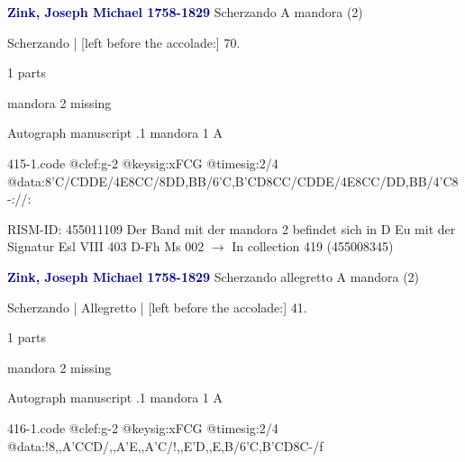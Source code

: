 \documentclass[twocolumn]{book}
\begin{document}
\newline \par \vspace{7pt} \textcolor{darkblue}{\textbf{Zink, Joseph Michael  1758-1829}}
\newline Scherzando  A  
\newline mandora (2)
\newline \begin{itshape}[f.36v, at left:] Scherzando | [left before the accolade:] 70.\end{itshape} 
\newline \textcolor{darkblue}{}  1 parts  
\newline \begin{small} mandora 2 missing\end{small} 
\newline Autograph manuscript
.1  mandora 1  A  
\begin{filecontents*}{415-1.code}
@clef:g-2
@keysig:xFCG
@timesig:2/4
@data:8'C/CDDE/4E{8CC}/8DD,BB/{6'C,B'CD}{8CC}/CDDE/4E{8CC}/DD,BB/4'C8-://:
\end{filecontents*}
\newline
%

\newline RISM-ID: 455011109
\newline Der Band mit der mandora 2 befindet sich in D Eu mit der Signatur Esl VIII 403
\newline D-Fh  Ms 002
\newline $\rightarrow$ In collection 419 (455008345)

\newline \par \vspace{7pt} \textcolor{darkblue}{\textbf{Zink, Joseph Michael  1758-1829}}
\newline Scherzando allegretto  A  
\newline mandora (2)
\newline \begin{itshape}[f.24r, at left:] Scherzando | Allegretto | [left before the accolade:] 41.\end{itshape} 
\newline \textcolor{darkblue}{}  1 parts  
\newline \begin{small} mandora 2 missing\end{small} 
\newline Autograph manuscript
.1  mandora 1  A  
\begin{filecontents*}{416-1.code}
@clef:g-2
@keysig:xFCG
@timesig:2/4
@data:!8,,A'CCD/,,A'E,,A'C/!,,E'D,,E,B/{6'C,B'CD}8C-/f
\end{filecontents*}
\newline
%
\end{document}
